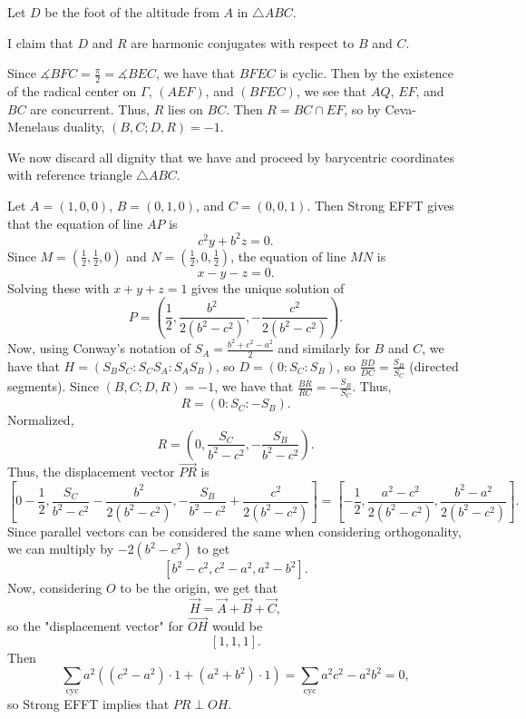 Let $D$ be the foot of the altitude from $A$ in $\triangle{ABC}$.

I claim that $D$ and $R$ are harmonic conjugates with respect to $B$ and $C$.

Since $\measuredangle{BFC}=\frac{\pi}{2}=\measuredangle{BEC}$, we have that $BFEC$ is cyclic. Then by the existence of the radical center on $\Gamma$, $\left(AEF\right)$, and $\left(BFEC\right)$, we see that $AQ$, $EF$, and $BC$ are concurrent. Thus, $R$ lies on $BC$. Then $R=BC\cap EF$, so by Ceva-Menelaus duality, $\left(B,C;D,R\right)=-1$.

We now discard all dignity that we have and proceed by barycentric coordinates with reference triangle $\triangle{ABC}$.

Let $A=\left(1,0,0\right)$, $B=\left(0,1,0\right)$, and $C=\left(0,0,1\right)$. Then Strong EFFT gives that the equation of line $AP$ is \[c^2y+b^2z=0.\] Since $M=\left(\frac{1}{2},\frac{1}{2},0\right)$ and $N=\left(\frac{1}{2},0,\frac{1}{2}\right)$, the equation of line $MN$ is \[x-y-z=0.\] Solving these with $x+y+z=1$ gives the unique solution of \[P=\left(\frac{1}{2},\frac{b^2}{2\left(b^2-c^2\right)},-\frac{c^2}{2\left(b^2-c^2\right)}\right).\] Now, using Conway's notation of $S_A=\frac{b^2+c^2-a^2}{2}$ and similarly for $B$ and $C$, we have that $H=\left(S_BS_C:S_CS_A:S_AS_B\right)$, so $D=\left(0:S_C:S_B\right)$, so $\frac{BD}{DC}=\frac{S_B}{S_C}$ (directed segments). Since $\left(B,C;D,R\right)=-1$, we have that $\frac{BR}{RC}=-\frac{S_B}{S_C}$. Thus, \[R=\left(0:S_C:-S_B\right).\] Normalized, \[R=\left(0,\frac{S_C}{b^2-c^2},-\frac{S_B}{b^2-c^2}\right).\] Thus, the displacement vector $\overrightarrow{PR}$ is \[\left[0-\frac{1}{2},\frac{S_C}{b^2-c^2}-\frac{b^2}{2\left(b^2-c^2\right)},-\frac{S_B}{b^2-c^2}+\frac{c^2}{2\left(b^2-c^2\right)}\right]=\left[-\frac{1}{2},\frac{a^2-c^2}{2\left(b^2-c^2\right)},\frac{b^2-a^2}{2\left(b^2-c^2\right)}\right].\] Since parallel vectors can be considered the same when considering orthogonality, we can multiply by $-2\left(b^2-c^2\right)$ to get \[\left[b^2-c^2,c^2-a^2,a^2-b^2\right].\] Now, considering $O$ to be the origin, we get that \[\overrightarrow{H}=\overrightarrow{A}+\overrightarrow{B}+\overrightarrow{C},\] so the "displacement vector" for $\overrightarrow{OH}$ would be \[\left[1,1,1\right].\] Then \[\displaystyle\sum_{\text{cyc}}a^2\left(\left(c^2-a^2\right)\cdot1+\left(a^2+b^2\right)\cdot1\right)=\displaystyle\sum_{\text{cyc}}a^2c^2-a^2b^2=0,\] so Strong EFFT implies that $PR\perp OH$.